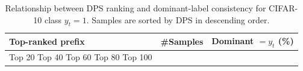 \begin{table}[t]
\centering
\begin{tabular}{lrr}
\toprule
Top-ranked prefix & \#Samples & Dominant $= y_t$ (\%) \\
\midrule
Top 20%
Top 40%
Top 60%
Top 80%
Top 100%
\bottomrule
\caption{Relationship between DPS ranking and dominant-label consistency for CIFAR-10 class $y_t=1$. Samples are sorted by DPS in descending order.}
\label{tab:class_1_prefix}
\end{tabular}
\end{table}
